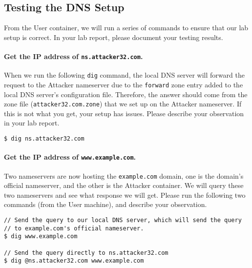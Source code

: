

\subsection{Testing the DNS Setup}

From the User container, we will run a series of commands to ensure 
that our lab setup is correct. In your lab report, please document
your testing results. 


\paragraph{Get the IP address of \texttt{ns.attacker32.com}.}
When we run the following \texttt{dig} command, 
the local DNS server will forward the request to the Attacker nameserver 
due to the \texttt{forward} zone entry added to the local DNS server's
configuration file. Therefore, the answer should come from
the zone file (\texttt{attacker32.com.zone}) that we set up on the Attacker nameserver.
If this is not what you get, your setup has issues. Please describe your
observation in your lab report. 

\begin{lstlisting}
$ dig ns.attacker32.com
\end{lstlisting}



\paragraph{Get the IP address of \texttt{www.example.com}.} 
Two nameservers are now hosting the \texttt{example.com} 
domain, one is the domain's official nameserver, and the other 
is the Attacker container. We will query these two nameservers and see what 
response we will get. 
Please run the following two commands (from the User machine), 
and describe your observation. 


\begin{lstlisting}
// Send the query to our local DNS server, which will send the query
// to example.com's official nameserver. 
$ dig www.example.com

// Send the query directly to ns.attacker32.com 
$ dig @ns.attacker32.com www.example.com
\end{lstlisting}
 


